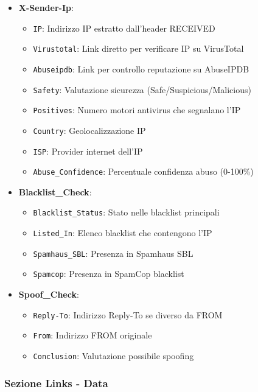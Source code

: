 \documentclass{article}
\begin{document}
\begin{itemize}
    \item \textbf{X-Sender-Ip}: 
    \begin{itemize}
        \item \texttt{IP}: Indirizzo IP estratto dall'header RECEIVED
        \item \texttt{Virustotal}: Link diretto per verificare IP su VirusTotal
        \item \texttt{Abuseipdb}: Link per controllo reputazione su AbuseIPDB
        \item \texttt{Safety}: Valutazione sicurezza (Safe/Suspicious/Malicious)
        \item \texttt{Positives}: Numero motori antivirus che segnalano l'IP
        \item \texttt{Country}: Geolocalizzazione IP
        \item \texttt{ISP}: Provider internet dell'IP
        \item \texttt{Abuse\_Confidence}: Percentuale confidenza abuso (0-100\%)
    \end{itemize}
    \item \textbf{Blacklist\_Check}:
    \begin{itemize}
        \item \texttt{Blacklist\_Status}: Stato nelle blacklist principali
        \item \texttt{Listed\_In}: Elenco blacklist che contengono l'IP
        \item \texttt{Spamhaus\_SBL}: Presenza in Spamhaus SBL
        \item \texttt{Spamcop}: Presenza in SpamCop blacklist
    \end{itemize}
    \item \textbf{Spoof\_Check}:
    \begin{itemize}
        \item \texttt{Reply-To}: Indirizzo Reply-To se diverso da FROM
        \item \texttt{From}: Indirizzo FROM originale
        \item \texttt{Conclusion}: Valutazione possibile spoofing
    \end{itemize}
\end{itemize}

\subsubsection{Sezione Links - Data}
\end{document}
